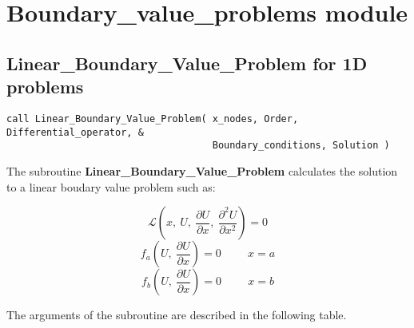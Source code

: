 \par\vspace{\baselineskip}
\lstset{language=Fortran}






\newpage



\section{Boundary\_value\_problems  module}

\subsection*{Linear\_Boundary\_Value\_Problem for 1D problems}

\lstset{language=Fortran}
\begin{lstlisting}[frame=trBL]
call Linear_Boundary_Value_Problem( x_nodes, Order, Differential_operator, & 
                                    Boundary_conditions, Solution )  
 \end{lstlisting}   

The subroutine \textbf{Linear\_Boundary\_Value\_Problem} calculates the solution to a linear boudary value problem such as:

\begin{equation*}
\mathscr{L}\left(x,\ U, \ \frac{\partial U}{\partial x}, \ \frac{\partial^2 U}{\partial x^2} \right) = 0
\end{equation*}
\begin{equation*}
f_a\left(U, \ \frac{\partial U}{\partial x}\right)=0 \hspace{1cm} x=a
\end{equation*}
\begin{equation*}
f_b\left(U, \ \frac{\partial U}{\partial x}\right)=0 \hspace{1cm} x=b
\end{equation*}



The arguments of the subroutine are described in the following table.

